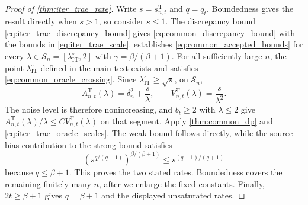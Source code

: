 \begin{proof}[Proof of \cref{thm:iter_trae_rate}]
Write $s=s_{n,t}^{\mathrm T}$ and $q=q_t$. Boundedness gives the result directly when $s>1$, so consider $s\leqslant1$. The discrepancy bound \eqref{eq:iter_trae_discrepancy_bound} gives \eqref{eq:common_discrepancy_bound} with the bounds in \eqref{eq:iter_trae_scale}.  establishes \eqref{eq:common_accepted_bounds} for every $\lambda\in\mathcal S_n=[\lambda_{\mathrm{IT}}^\circ,2]$ with $\gamma=\beta/(\beta+1)$. For all sufficiently large $n$, the point $\lambda_{\mathrm{IT}}^\circ$ defined in the main text exists and satisfies \eqref{eq:common_oracle_crossing}. Since $\lambda_{\mathrm{IT}}^\circ\geqslant\sqrt{s}$, on $\mathcal S_n$,
\[
A_{n,t}^{\mathrm T}(\lambda)=\delta_n^2+\frac{s}{\lambda},
\qquad
V_{n,t}^{\mathrm T}(\lambda)=\frac{s}{\lambda^2}.
\]
The noise level is therefore nonincreasing, and $b_t\geqslant2$ with $\lambda\leqslant2$ give $A_{n,t}^{\mathrm T}(\lambda)/\lambda\leqslant CV_{n,t}^{\mathrm T}(\lambda)$ on that segment. Apply \cref{thm:common_dp} and \eqref{eq:iter_trae_oracle_scales}. The weak bound follows directly, while the source-bias contribution to the strong bound satisfies
\[
(s^{q/(q+1)})^{\beta/(\beta+1)} \leqslant s^{(q-1)/(q+1)}
\]
because $q\leqslant\beta+1$. This proves the two stated rates. Boundedness covers the remaining finitely many $n$, after we enlarge the fixed constants. Finally, $2t\geqslant\beta+1$ gives $q=\beta+1$ and the displayed unsaturated rates.
\end{proof}

